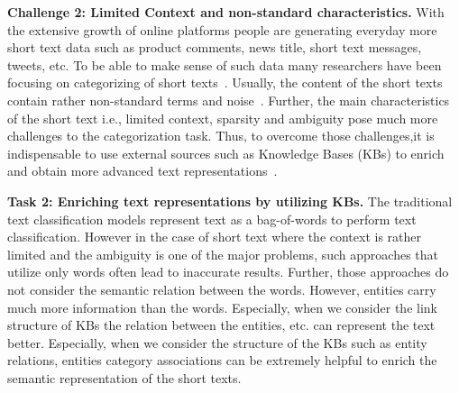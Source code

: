 \noindent  \textbf{Challenge 2: Limited Context and non-standard characteristics.%
} With the extensive growth of online platforms people are generating everyday more short text data such as product comments, news title, short text messages, tweets, etc. To be able to make sense of such data many researchers have been focusing on categorizing of short texts~\cite{...}. Usually, the content of the short texts contain rather non-standard terms and noise~\cite{song2014short}. Further, the main characteristics of the short text i.e., limited context, sparsity and ambiguity pose much more challenges to the categorization task. 
Thus, to overcome those challenges,it  is  indispensable  to  use  external  sources  such  as  Knowledge  Bases  (KBs)  to enrich and obtain more advanced text representations~\cite{deepShort}.

\noindent  \textbf{Task 2: Enriching text representations by utilizing KBs.} 
The traditional text classification models represent text as a bag-of-words to perform text classification. However in the case of short text where the context is rather limited and the ambiguity is one of the major problems, such approaches that utilize only words often lead to inaccurate results. 
Further, those approaches do not consider the semantic relation between the words. However, entities carry much more information than the words. Especially, when we consider the link structure of KBs the relation between the entities, etc. can represent the text better. Especially, when we consider the structure of the KBs such as entity relations, entities category associations can be extremely helpful to enrich the semantic representation of the short texts.    






